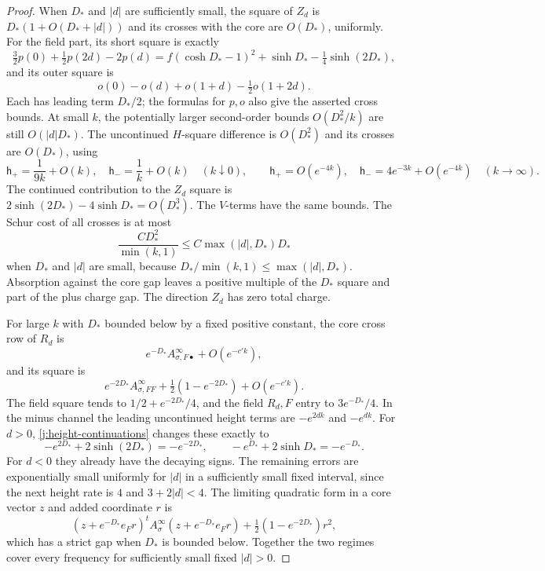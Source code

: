 \begin{proof}
When \(D_*\) and \(|d|\) are sufficiently small, the square of \(Z_d\) is
\(D_*(1+O(D_*+|d|))\) and its crosses with the core are \(O(D_*)\), uniformly. For the field part, its short square is exactly
\[
\tfrac32p(0)+\tfrac12p(2d)-2p(d)
=f(\cosh D_*-1)^2+\sinh D_*-\tfrac14\sinh(2D_*),
\]
and its outer square is
\[
o(0)-o(d)+o(1+d)-\tfrac12o(1+2d).
\]
Each has leading term \(D_*/2\); the formulas for \(p,o\) also give the asserted cross bounds. At small \(k\), the potentially larger second-order bounds \(O(D_*^2/k)\) are still \(O(|d|D_*)\). The uncontinued \(H\)-square difference is \(O(D_*^2)\) and its crosses are \(O(D_*)\), using
\[
\mathsf h_+=\frac1{9k}+O(k),\quad
\mathsf h_-=\frac1k+O(k)\quad(k\downarrow0),\qquad
\mathsf h_+=O(e^{-4k}),\quad
\mathsf h_-=4e^{-3k}+O(e^{-4k})\quad(k\to\infty).
\]
The continued contribution to the \(Z_d\) square is
\(2\sinh(2D_*)-4\sinh D_*=O(D_*^3)\). The \(V\)-terms have the same bounds. The Schur cost of all crosses is at most
\[
\frac{C D_*^2}{\min(k,1)}
\le C\max(|d|,D_*)D_*
\]
when \(D_*\) and \(|d|\) are small, because
\(D_*/\min(k,1)\le\max(|d|,D_*)\). Absorption against the core gap leaves a positive multiple of the \(D_*\) square and part of the plus charge gap. The direction \(Z_d\) has zero total charge.

For large \(k\) with \(D_*\) bounded below by a fixed positive constant, the core cross row of \(R_d\) is
\[
e^{-D_*}A^\infty_{\sigma,F\bullet}+O(e^{-c'k}),
\]
and its square is
\[
e^{-2D_*}A^\infty_{\sigma,FF}
+\tfrac12(1-e^{-2D_*})+O(e^{-c'k}).
\]
The field square tends to \(1/2+e^{-2D_*}/4\), and the field \(R_d,F\) entry to \(3e^{-D_*}/4\). In the minus channel the leading uncontinued height terms are \(-e^{2dk}\) and \(-e^{dk}\). For \(d>0\), \eqref{j:height-continuations} changes these exactly to
\[
-e^{2D_*}+2\sinh(2D_*)=-e^{-2D_*},\qquad
-e^{D_*}+2\sinh D_*=-e^{-D_*}.
\]
For \(d<0\) they already have the decaying signs. The remaining errors are exponentially small uniformly for \(|d|\) in a sufficiently small fixed interval, since the next height rate is \(4\) and \(3+2|d|<4\). The limiting quadratic form in a core vector \(z\) and added coordinate \(r\) is
\[
(z+e^{-D_*}e_F r)^tA_\sigma^\infty
(z+e^{-D_*}e_F r)+\tfrac12(1-e^{-2D_*})r^2,
\]
which has a strict gap when \(D_*\) is bounded below. Together the two regimes cover every frequency for sufficiently small fixed \(|d|>0\).


\end{proof}
